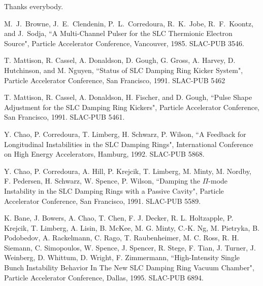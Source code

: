 \documentclass[aps,prl,preprint,groupedaddress]{revtex4-1}
\begin{document}
\begin{acknowledgments}
Thanks everybody.
\end{acknowledgments}

\begin{thebibliography}{9}
% 
  M.~J.~Browne, J.~E.~Clendenin, P.~L.~Corredoura, R.~K.~Jobe, R.~F.~Koontz, and J.~Sodja, 
  ``A Multi-Channel Pulser for the SLC Thermionic Electron Source", 
  Particle Accelerator Conference, Vancouver, 1985. 
  SLAC-PUB 3546.
  
  T. Mattison, R. Cassel, A. Donaldson, D. Gough, G. Gross, A. Harvey, D. Hutchinson, and M. Nguyen,
  ``Status of SLC Damping Ring Kicker System",
  Particle Accelerator Conference, San Francisco, 1991.
  SLAC-PUB 5462
  
  T. Mattison, R. Cassel, A. Donaldson, H. Fischer, and D. Gough,
  ``Pulse Shape Adjustment for the SLC Damping Ring Kickers",
  Particle Accelerator Conference, San Francisco, 1991.
  SLAC-PUB 5461.
  
  Y. Chao, P. Corredoura, T. Limberg, H. Schwarz, P. Wilson,
  ``A Feedback for Longitudinal Instabilities in the SLC Damping Rings",
  International Conference on High Energy Accelerators, Hamburg, 1992.
  SLAC-PUB 5868.
  
  Y. Chao, P. Corredoura, A. Hill, P. Krejcik, T. Limberg, M. Minty, M. Nordby, F. Pedersen, H. Schwarz, W. Spence, P. Wilson,
  ``Damping the $\Pi$-mode Instability in the SLC Damping Rings with a Passive Cavity",
  Particle Accelerator Conference, San Francisco, 1991.
  SLAC-PUB 5589.
  
  K. Bane, J. Bowers, A. Chao, T. Chen, F. J. Decker, R. L. Holtzapple, P. Krejcik, T. Limberg, A. Lisin, B. McKee, M. G. Minty, C.-K. Ng, M. Pietryka, B. Podobedov, A. Rackelmann, C. Rago, T. Raubenheimer, M. C. Ross, R. H. Siemann, C. Simopoulos, W. Spence, J. Spencer, R. Stege, F. Tian, J. Turner, J. Weinberg, D. Whittum, D. Wright, F. Zimmermann,
  ``High-Intensity Single Bunch Instability Behavior In The New SLC Damping Ring Vacuum Chamber",
  Particle Accelerator Conference, Dallas, 1995.
  SLAC-PUB 6894.
    
\end{thebibliography}
\end{document}
